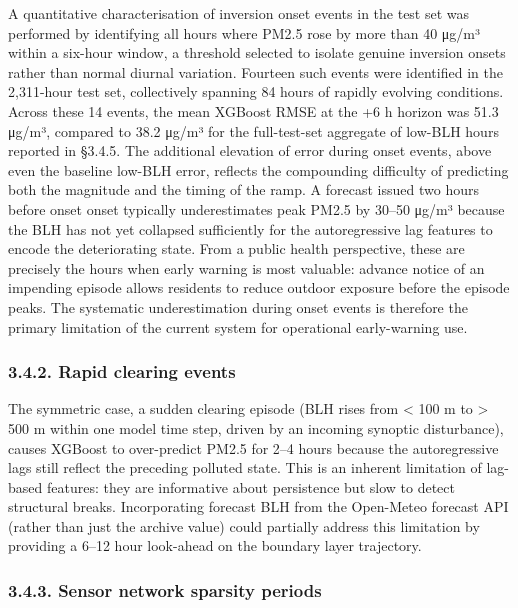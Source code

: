 A quantitative characterisation of inversion onset events in the test set was performed by identifying all hours where PM2.5 rose by more than 40 μg/m³ within a six-hour window, a threshold selected to isolate genuine inversion onsets rather than normal diurnal variation. Fourteen such events were identified in the 2,311-hour test set, collectively spanning 84 hours of rapidly evolving conditions. Across these 14 events, the mean XGBoost RMSE at the +6 h horizon was 51.3 μg/m³, compared to 38.2 μg/m³ for the full-test-set aggregate of low-BLH hours reported in §3.4.5. The additional elevation of error during onset events, above even the baseline low-BLH error, reflects the compounding difficulty of predicting both the magnitude and the timing of the ramp. A forecast issued two hours before onset onset typically underestimates peak PM2.5 by 30--50 μg/m³ because the BLH has not yet collapsed sufficiently for the autoregressive lag features to encode the deteriorating state. From a public health perspective, these are precisely the hours when early warning is most valuable: advance notice of an impending episode allows residents to reduce outdoor exposure before the episode peaks. The systematic underestimation during onset events is therefore the primary limitation of the current system for operational early-warning use.

\subsubsection{3.4.2. Rapid clearing events}\label{rapid-clearing-events}

The symmetric case, a sudden clearing episode (BLH rises from \textless{} 100 m to \textgreater{} 500 m within one model time step, driven by an incoming synoptic disturbance), causes XGBoost to over-predict PM2.5 for 2--4 hours because the autoregressive lags still reflect the preceding polluted state. This is an inherent limitation of lag-based features: they are informative about persistence but slow to detect structural breaks. Incorporating forecast BLH from the Open-Meteo forecast API (rather than just the archive value) could partially address this limitation by providing a 6--12 hour look-ahead on the boundary layer trajectory.

\subsubsection{3.4.3. Sensor network sparsity periods}\label{sensor-network-sparsity-periods}

